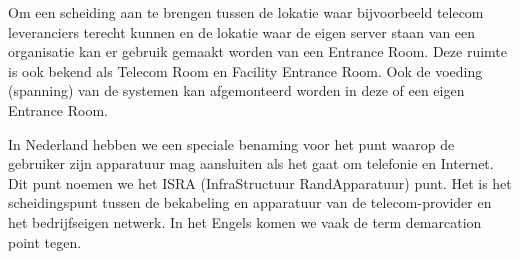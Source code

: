 Om een scheiding aan te brengen tussen de lokatie waar bijvoorbeeld telecom leveranciers terecht kunnen en de lokatie waar de eigen server staan van een organisatie kan er gebruik gemaakt worden van een Entrance Room. Deze ruimte is ook bekend als Telecom Room en Facility Entrance Room. Ook de voeding (spanning) van de systemen kan afgemonteerd worden in deze of een eigen Entrance Room.

In Nederland hebben we een speciale benaming voor het punt waarop de gebruiker zijn apparatuur mag aansluiten als het gaat om telefonie en Internet. Dit punt noemen we het ISRA (InfraStructuur RandApparatuur) punt. Het is het scheidingspunt tussen de bekabeling en apparatuur van de telecom-provider en het bedrijfseigen netwerk. In het Engels komen we vaak de term demarcation point tegen.
